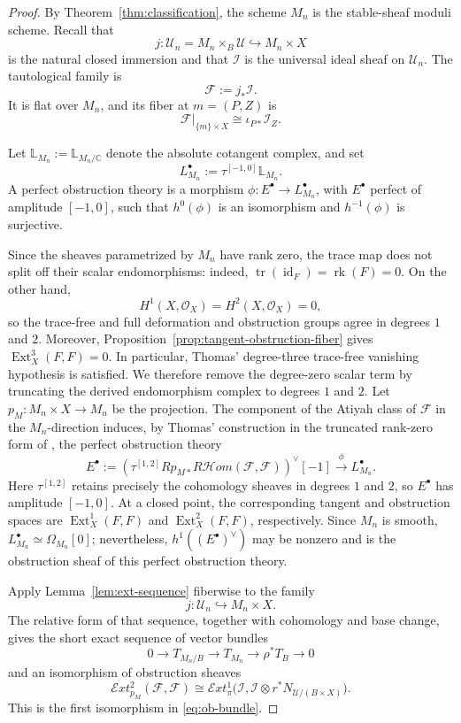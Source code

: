 \documentclass[12pt]{amsart}
\numberwithin{equation}{section}
\newcommand{\C}{\mathbb{C}}
\newcommand{\OO}{\mathcal{O}}
\newcommand{\I}{\mathcal{I}}
\newcommand{\Ext}{\operatorname{Ext}}
\newcommand{\rk}{\operatorname{rk}}
\newcommand{\dual}{\vee}
\theoremstyle{plain}
\theoremstyle{definition}
\theoremstyle{remark}
\begin{document}
\begin{proof}
By Theorem~\ref{thm:classification}, the scheme $M_n$ is the stable-sheaf moduli scheme.
Recall that
\[
j\colon \mathcal U_n=M_n\times_B\mathcal U\hookrightarrow M_n\times X
\]
is the natural closed immersion and that $\mathcal I$ is the universal ideal sheaf on $\mathcal U_n$.
The tautological family is
\[
\mathcal F:=j_*\mathcal I.
\]
It is flat over $M_n$, and its fiber at $m=(P,Z)$ is
\[
\mathcal F|_{\{m\}\times X}\cong \iota_{P*}\I_Z.
\]

Let $\mathbb{L}_{M_n}:=\mathbb{L}_{M_n/\C}$ denote the absolute cotangent complex, and set
\[
L_{M_n}^\bullet:=\tau^{[-1,0]}\mathbb{L}_{M_n}.
\]
A perfect obstruction theory is a morphism $\phi\colon E^\bullet\to L_{M_n}^\bullet$, with $E^\bullet$ perfect of amplitude $[-1,0]$, such that $h^0(\phi)$ is an isomorphism and $h^{-1}(\phi)$ is surjective.

Since the sheaves parametrized by $M_n$ have rank zero, the trace map does not split off their scalar endomorphisms: indeed, $\operatorname{tr}(\operatorname{id}_F)=\rk(F)=0$.
On the other hand,
\[
H^1(X,\OO_X)=H^2(X,\OO_X)=0,
\]
so the trace-free and full deformation and obstruction groups agree in degrees $1$ and $2$.
Moreover, Proposition~\ref{prop:tangent-obstruction-fiber} gives $\Ext^3_X(F,F)=0$.
In particular, Thomas' degree-three trace-free vanishing hypothesis is satisfied.
We therefore remove the degree-zero scalar term by truncating the derived endomorphism complex to degrees $1$ and $2$.
Let $p_M\colon M_n\times X\to M_n$ be the projection.
The component of the Atiyah class of $\mathcal F$ in the $M_n$-direction induces, by Thomas' construction \cite{Thomas} in the truncated rank-zero form of \cite[Theorem~2.3]{GSmod}, the perfect obstruction theory
\[
E^\bullet:=
\left(\tau^{[1,2]}R p_{M*}R\mathcal Hom(\mathcal F,\mathcal F)\right)^\dual[-1]
\xrightarrow{\ \phi\ } L_{M_n}^\bullet.
\]
Here $\tau^{[1,2]}$ retains precisely the cohomology sheaves in degrees $1$ and $2$, so $E^\bullet$ has amplitude $[-1,0]$.
At a closed point, the corresponding tangent and obstruction spaces are $\Ext^1_X(F,F)$ and $\Ext^2_X(F,F)$, respectively.
Since $M_n$ is smooth, $L_{M_n}^\bullet\simeq\Omega_{M_n}[0]$; nevertheless, $h^1((E^\bullet)^\dual)$ may be nonzero and is the obstruction sheaf of this perfect obstruction theory.

Apply Lemma~\ref{lem:ext-sequence} fiberwise to the family
\[
j\colon \mathcal U_n\hookrightarrow M_n\times X.
\]
The relative form of that sequence, together with cohomology and base change, gives the short exact sequence of vector bundles
\begin{equation}\label{eq:global-tangent-exact}
0\longrightarrow T_{M_n/B}\longrightarrow T_{M_n}\longrightarrow \rho^*T_B\longrightarrow 0
\end{equation}
and an isomorphism of obstruction sheaves
\[
\mathcal Ext^2_{p_M}(\mathcal F,\mathcal F)
\cong
\mathcal Ext^1_{\pi}\bigl(\mathcal I,\mathcal I\otimes r^*N_{\mathcal U/(B\times X)}\bigr).
\]
This is the first isomorphism in \eqref{eq:ob-bundle}.


\end{proof}
\end{document}
